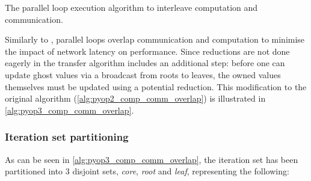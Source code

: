 \documentclass[thesis]{subfiles}
\begin{document}
\begin{algorithm}
  \caption{The  parallel loop execution algorithm to interleave computation and communication.}
  \begin{algorithmic}[1]
    \State {} 

     
      \State {}
    \EndFor

    \State {} 
    \State {} 

     
      \State {}
    \EndFor

    \State {} 

     
      \State {}
    \EndFor
  \end{algorithmic}
  \label{alg:pyop3_comp_comm_overlap}
\end{algorithm}

Similarly to ,  parallel loops overlap communication and computation to minimise the impact of network latency on performance.
Since reductions are not done eagerly in  the transfer algorithm includes an additional step: before one can update ghost values via a broadcast from roots to leaves, the owned values themselves must be updated using a potential reduction.
This modification to the original  algorithm (\cref{alg:pyop2_comp_comm_overlap}) is illustrated in \cref{alg:pyop3_comp_comm_overlap}.


\subsubsection{Iteration set partitioning}

As can be seen in \cref{alg:pyop3_comp_comm_overlap}, the iteration set has been partitioned into 3 disjoint sets, \textit{core}, \textit{root} and \textit{leaf}, representing the following:
\end{document}
